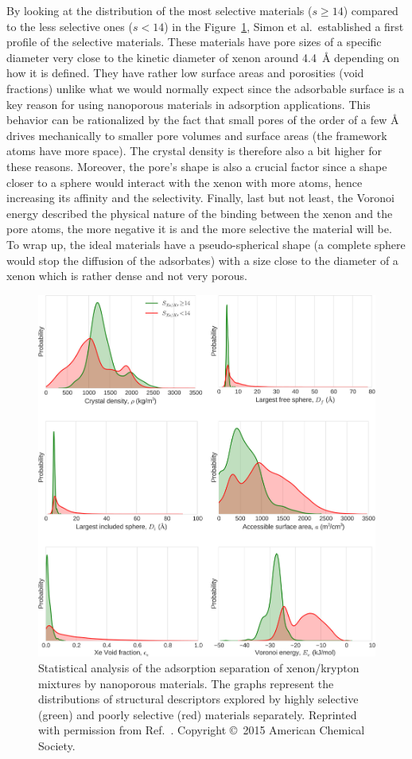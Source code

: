 \documentclass[main.tex]{subfiles}
\begin{document}
By looking at the distribution of the most selective materials ($s\geq 14$) compared to the less selective ones ($s<14$) in the Figure~\ref{fgr:Simon2015}, Simon et al.\ established a first profile of the selective materials. These materials have pore sizes of a specific diameter very close to the kinetic diameter of xenon around \SI{4.4}{\angstrom} depending on how it is defined. They have rather low surface areas and porosities (void fractions) unlike what we would normally expect since the adsorbable surface is a key reason for using nanoporous materials in adsorption applications. This behavior can be rationalized by the fact that small pores of the order of a few \si{\angstrom} drives mechanically to smaller pore volumes and surface areas (the framework atoms have more space). The crystal density is therefore also a bit higher for these reasons. Moreover, the pore's shape is also a crucial factor since a shape closer to a sphere would interact with the xenon with more atoms, hence increasing its affinity and the selectivity. Finally, last but not least, the Voronoi energy described the physical nature of the binding between the xenon and the pore atoms, the more negative it is and the more selective the material will be. To wrap up, the ideal materials have a pseudo-spherical shape (a complete sphere would stop the diffusion of the adsorbates) with a size close to the diameter of a xenon which is rather dense and not very porous.

\begin{figure}[ht]
\centering
  \includegraphics[width=0.7\linewidth]{figures/1-screening/Simon_2015_descriptors.jpeg}
  \caption{Statistical analysis of the adsorption separation of xenon/krypton mixtures by nanoporous materials. The graphs represent the distributions of structural descriptors explored by highly selective (green) and poorly selective (red) materials separately. Reprinted with permission from Ref.~\cite{Simon_2015}. Copyright \copyright\ 2015 American Chemical Society.}\label{fgr:Simon2015}
\end{figure}
\end{document}

